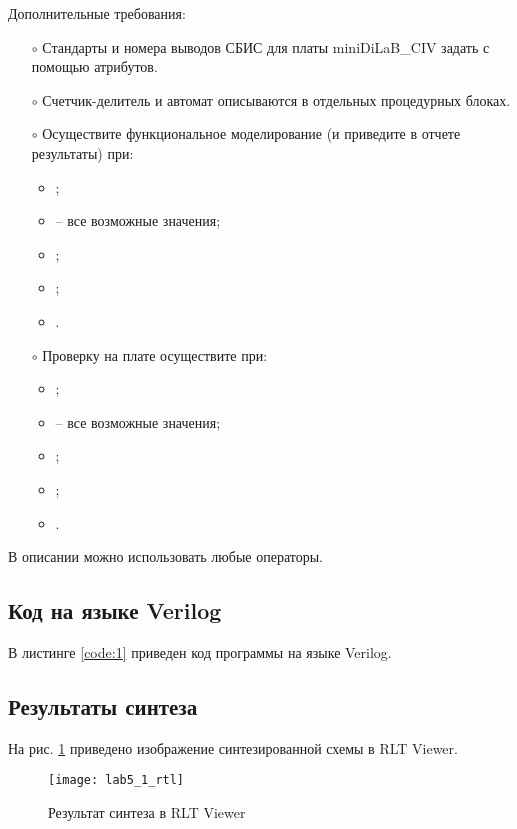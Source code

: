 Дополнительные требования:
\begin{itemize}
	\item[$\circ$] Стандарты и номера выводов СБИС для платы miniDiLaB\_CIV задать с помощью атрибутов.
	\item[$\circ$] Счетчик-делитель и автомат описываются в отдельных процедурных блоках.
	\item[$\circ$] Осуществите функциональное моделирование (и приведите в отчете результаты) при:
		\begin{itemize}
			\item {};
			\item {} -- все возможные значения;
			\item {};
			\item {};
			\item {}.
		\end{itemize}
	\item[$\circ$] Проверку на плате осуществите при:
		\begin{itemize}
			\item {};
			\item {} -- все возможные значения;
			\item {}; 
			\item {};
			\item {}.
		\end{itemize}
\end{itemize}
В описании можно использовать любые операторы.

\subsection{Код на языке Verilog}

В листинге \ref{code:1} приведен код программы на языке Verilog.



\subsection{Результаты синтеза}

На рис. \ref{fig:lab5_1_rtl} приведено изображение синтезированной схемы в RLT Viewer.

\begin{figure}[H]
\begin{center}
	\texttt{[image: lab5\_1\_rtl]}
	\caption{Результат синтеза в RLT Viewer}
	\label{fig:lab5_1_rtl}
\end{center}
\end{figure}

